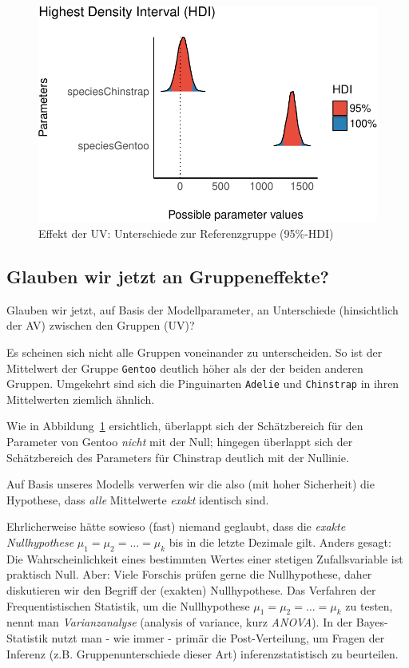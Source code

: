 \documentclass[
  a4paper,
  DIV=11]{scrreprt}
\theoremstyle{definition}
\theoremstyle{remark}
\begin{document}
\begin{figure}[H]

{\centering \includegraphics{./metrische-AV_files/figure-pdf/fig-m106-params-1.pdf}

}

\caption{\label{fig-m106-params}Effekt der UV: Unterschiede zur
Referenzgruppe (95\%-HDI)}

\end{figure}

\hypertarget{glauben-wir-jetzt-an-gruppeneffekte}{%
\subsection{Glauben wir jetzt an
Gruppeneffekte?}\label{glauben-wir-jetzt-an-gruppeneffekte}}

Glauben wir jetzt, auf Basis der Modellparameter, an Unterschiede
(hinsichtlich der AV) zwischen den Gruppen (UV)?

Es scheinen sich nicht alle Gruppen voneinander zu unterscheiden. So ist
der Mittelwert der Gruppe \texttt{Gentoo} deutlich höher als der der
beiden anderen Gruppen. Umgekehrt sind sich die Pinguinarten
\texttt{Adelie} und \texttt{Chinstrap} in ihren Mittelwerten ziemlich
ähnlich.

Wie in Abbildung~\ref{fig-m106-params} ersichtlich, überlappt sich der
Schätzbereich für den Parameter von Gentoo \emph{nicht} mit der Null;
hingegen überlappt sich der Schätzbereich des Parameters für Chinstrap
deutlich mit der Nullinie.

Auf Basis unseres Modells verwerfen wir die also (mit hoher Sicherheit)
die Hypothese, dass \emph{alle} Mittelwerte \emph{exakt} identisch sind.

Ehrlicherweise hätte sowieso (fast) niemand geglaubt, dass die
\emph{exakte Nullhypothese} \(\mu_1 = \mu_2 = \ldots = \mu_k\) bis in
die letzte Dezimale gilt. Anders gesagt: Die Wahrscheinlichkeit eines
bestimmten Wertes einer stetigen Zufallsvariable ist praktisch Null.
Aber: Viele Forschis prüfen gerne die Nullhypothese, daher diskutieren
wir den Begriff der (exakten) Nullhypothese. Das Verfahren der
Frequentistischen Statistik, um die Nullhypothese
\(\mu_1 = \mu_2 = \ldots = \mu_k\) zu testen, nennt man
\emph{Varianzanalyse} (analysis of variance, kurz \emph{ANOVA}). In der
Bayes-Statistik nutzt man - wie immer - primär die Post-Verteilung, um
Fragen der Inferenz (z.B. Gruppenunterschiede dieser Art)
inferenzstatistisch zu beurteilen.
\end{document}
